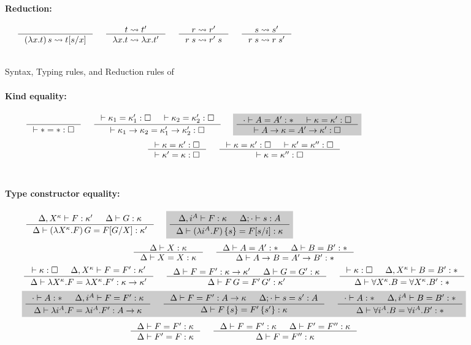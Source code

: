 \begin{figure*}
\paragraph{Reduction:} 
$ 
 ~~~~
   \inference{}{(\lambda x.t)\,s \rightsquigarrow t[s/x]}
 ~~~~
   \inference{t \rightsquigarrow t'}{\lambda x.t \rightsquigarrow \lambda x.t'}
 ~~~~
   \inference{r \rightsquigarrow r'}{r\;s \rightsquigarrow r'\;s}
 ~~~~
   \inference{s \rightsquigarrow s'}{r\;s \rightsquigarrow r\;s'}
$
~\\ ~\\
\caption{Syntax, Typing rules, and Reduction rules of \Fi}
\label{fig:Fi}
\end{figure*}

\begin{figure*}
\paragraph{Kind equality:} 
$ \quad
 ~~~~
   \inference{}{|- * = *:\square}
 ~~~~
   \inference{ |- \kappa_1 = \kappa_1' : \square
             & |- \kappa_2 = \kappa_2' : \square }
             {|- \kappa_1 -> \kappa_2 = \kappa_1' -> \kappa_2' : \square}
 ~~~~ \newFi{
   \inference{\cdot |- A=A':* & |- \kappa=\kappa':\square}
             {|- A -> \kappa = A' -> \kappa' : \square} }
$
\[ \inference{|- \kappa=\kappa':\square}
             {|- \kappa'=\kappa:\square}
 ~~~~
   \inference{ |- \kappa =\kappa' :\square
             & |- \kappa'=\kappa'':\square}
             {|- \kappa=\kappa'':\square}
\]
~\\
\paragraph{Type constructor equality:} 
$ \quad
 ~~~~
   \inference{\Delta,X^\kappa |- F:\kappa' & \Delta |- G:\kappa}
             {\Delta |- (\lambda X^\kappa.F)\,G = F[G/X]:\kappa'}
 ~~~~ \newFi{
   \inference{\Delta,i^A |- F:\kappa & \Delta;\cdot |- s:A}
             {\Delta |- (\lambda i^A.F)\,\{s\} = F[s/i]:\kappa} }
$
\[ \inference{\Delta |- X:\kappa }{\Delta |- X=X:\kappa}
 ~~~~
   \inference{\Delta |- A=A':* & \Delta |- B=B':*}{\Delta |- A-> B=A'-> B':*}
\]
\[ \inference{|- \kappa:\square & \Delta,X^\kappa |- F=F' : \kappa'}
             {\Delta |- \lambda X^\kappa.F=\lambda X^\kappa.F':\kappa-> \kappa'}
 ~~~~
   \inference{\Delta |- F=F':\kappa->\kappa' & \Delta |- G=G':\kappa}
             {\Delta |- F\,G = F'\,G' : \kappa'}
 ~~~~
   \inference{|- \kappa:\square & \Delta,X^\kappa |- B=B':*}
             {\Delta |- \forall X^\kappa.B=\forall X^\kappa.B':*}
\]
\[ \newFi{
   \inference{\cdot |- A:* & \Delta,i^A |- F=F' : \kappa}
             {\Delta |- \lambda i^A.F=\lambda i^A.F' : A -> \kappa}
 ~~~~
   \inference{\Delta |- F=F':A->\kappa & \Delta;\cdot |- s=s':A}
             {\Delta |- F\,\{s\} = F'\,\{s'\} : \kappa}
 ~~~~
   \inference{\cdot |- A:* & \Delta,i^A |- B=B':*}
             {\Delta |- \forall i^A.B=\forall i^A.B':*} }
\]
\[ \inference{\Delta |- F = F' : \kappa}{\Delta |- F' = F : \kappa}
 ~~~~
   \inference{\Delta |- F = F' : \kappa & \Delta |- F' = F'' : \kappa}
             {\Delta |- F = F'' : \kappa}
\]
~\\

\end{figure*}
